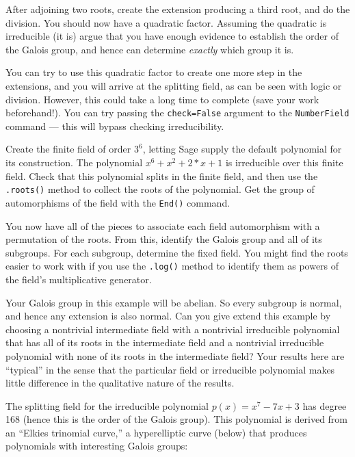 %
After adjoining two roots, create the extension producing a third root, and do the division.  You should now have a quadratic factor.  Assuming the quadratic is irreducible (it is) argue that you have enough evidence to establish the order of the Galois group, and hence can determine \emph{exactly} which group it is.\par
%
You can try to use this quadratic factor to create one more step in the extensions, and you will arrive at the splitting field, as can be seen with logic or division.  However, this could take a long time to complete (save your work beforehand!).  You can try passing the \verb?check=False? argument to the \verb?NumberField? command --- this will bypass checking irreducibility.
\begin{sageverbatim}\end{sageverbatim}
%
%
Create the finite field of order $3^6$, letting Sage supply the default polynomial for its construction.  The polynomial $x^6+x^2+2*x+1$ is irreducible over this finite field.  Check that this polynomial splits in the finite field, and then use the \verb?.roots()? method to collect the roots of the polynomial.  Get the group of automorphisms of the field with the \verb?End()? command.\par
%
You now have all of the pieces to associate each field automorphism with a permutation of the roots.  From this, identify the Galois group and all of its subgroups.  For each subgroup, determine the fixed field.  You might find the roots easier to work with if you use the \verb?.log()? method to identify them as powers of the field's multiplicative generator.\par
%
Your Galois group in this example will be abelian.  So every subgroup is normal, and hence any extension is also normal.  Can you give extend this example by choosing a nontrivial intermediate field with a nontrivial irreducible polynomial that has all of its roots in the intermediate field and a nontrivial irreducible polynomial with none of its roots in the intermediate field?
%
Your results here are ``typical'' in the sense that the particular field or irreducible polynomial makes little difference in the qualitative nature of the results.
\begin{sageverbatim}\end{sageverbatim}
%
%
The splitting field for the irreducible polynomial $p(x)=x^7-7x+3$ has degree 168 (hence this is the order of the Galois group).  This polynomial is derived from an ``Elkies trinomial curve,'' a hyperelliptic curve (below) that produces polynomials with interesting Galois groups:
